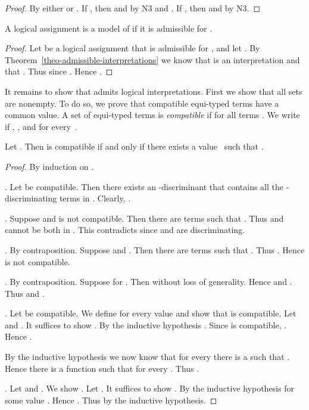 \begin{proof}
  By  either  or .
  If , then  and  by N3 and .
  If , then  and  by N3.
\end{proof}

\begin{lem}
  \label{lemma-adm-model}
  A logical assignment is a model of  if it is
  admissible for .
\end{lem}

\begin{proof}
  Let  be a logical assignment that is
  admissible for , and let .  By
  Theorem~\ref{theo-admissible-interpretations} we know
  that  is an interpretation and that
  .  Thus  since
  .  Hence .
\end{proof}

It remains to show that  admits logical
interpretations.  First we show that all sets
 are nonempty.  To do so, we prove that
compatible equi-typed terms have a common value.  A set
 of equi-typed terms is \emph{compatible} if  for all terms .  We write
\emph{} if ,
, and  for every~.

\begin{lem}
  \label{lem-common-value}
  Let .  Then  is compatible if
  and only if there exists a value~ such that
  .
\end{lem}

\begin{proof}
  By induction on .  

  \br .  Let  be
  compatible.  Then there exists an
  -discriminant  that contains all the
  -discriminating terms in .  
  Clearly, . 

  \br . 
  Suppose  and  is not compatible.  Then there
  are terms  such that
  .  Thus  and
   cannot be both in .  This contradicts
   since  and  are
  discriminating.

  \br .  By contraposition.
  Suppose  and . Then there are
  terms  such that .
  Thus .  Hence  is not compatible.

  \br .  By contraposition.
  Suppose  for .  Then
   without loss of generality.
  Hence  and .  Thus 
  and .

  \br .  Let  be
  compatible.  We define  for every value 
  and show that  is compatible.  Let  and .  It suffices to show
  .  By the inductive hypothesis
  .
  Since  is compatible, .
  Hence .


  By the inductive hypothesis we now know that for
  every  there is a  such
  that .  Hence there is a function
   such that  for
  every .  Thus .

  \br .  Let
   and .  We show
  .  Let .  It suffices
  to show .  By the inductive hypothesis
   for some value .  Hence
  .  Thus  by
  the inductive hypothesis.
\end{proof}

